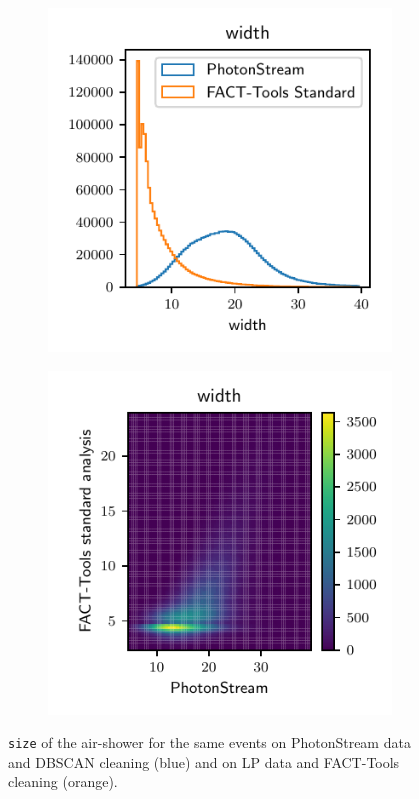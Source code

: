 \begin{figure}
  \begin{subfigure}{0.5\textwidth}
    \centering
  \includegraphics[width=\textwidth, page=3]{Plots/std_phs_comparison_hist_same_DBSCAN_crab.pdf}
  \end{subfigure}
  \begin{subfigure}{0.5\textwidth}
    \centering
    \includegraphics[width=\textwidth, page=3]{Plots/std_phs_comparison_DBSCAN_crab.pdf}
  \end{subfigure}
  \caption{\texttt{size} of the air-shower for the same events on PhotonStream data and DBSCAN cleaning (blue) and on LP data and FACT-Tools cleaning (orange).}
  \label{fig:size_comp}
\end{figure}
